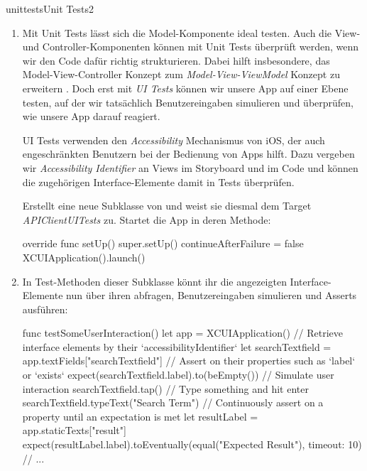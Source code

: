 \documentclass[parskip=half, final]{scrreprt}
\begin{document}
\begin{lecture}
\begin{exc}
\begin{excitem}{unittests}{Unit Tests}{2}
\begin{enumerate}[label=\arabic*.]
Testet natürlich auch die asynchrone API Abfrage. Dazu können wir im Test eine \emph{Expectation} erstellen und mit einem Timeout darauf warten, dass diese asynchron erfüllt wird:
\begin{swiftcode}
    func testSomethingAsynchronous() {
        let expectation = expectationWithDescription("Something asynchronous")
        // Do something asynchronously and call `expectation.fulfill()` when it's done.
        waitForExpectationsWithTimeout(10, handler: nil)
    }
\end{swiftcode}

\item Mit Unit Tests lässt sich die Model-Komponente ideal testen. Auch die View- und Controller-Komponenten können mit Unit Tests überprüft werden, wenn wir den Code dafür richtig strukturieren. Dabei hilft insbesondere, das Model-View-Controller Konzept zum \emph{Model-View-ViewModel} Konzept zu erweitern . Doch erst mit \emph{UI Tests} können wir unsere App auf einer Ebene testen, auf der wir tatsächlich Benutzereingaben simulieren und überprüfen, wie unsere App darauf reagiert.

UI Tests verwenden den \emph{Accessibility} Mechanismus von iOS, der auch engeschränkten Benutzern bei der Bedienung von Apps hilft. Dazu vergeben wir \emph{Accessibility Identifier} an Views im Storyboard und im Code und können die zugehörigen Interface-Elemente damit in Tests überprüfen.

Erstellt eine neue Subklasse von  und weist sie diesmal dem Target \emph{APIClientUITests} zu. Startet die App in deren  Methode:
\begin{swiftcode}
    override func setUp() {
        super.setUp()
        continueAfterFailure = false
        XCUIApplication().launch()
    }
\end{swiftcode}

\item In Test-Methoden dieser Subklasse könnt ihr die angezeigten Interface-Elemente nun über ihren  abfragen, Benutzereingaben simulieren und Asserts ausführen:
\begin{swiftcode}
    func testSomeUserInteraction() {
        let app = XCUIApplication()
        // Retrieve interface elements by their `accessibilityIdentifier`
        let searchTextfield = app.textFields["searchTextfield"]
        // Assert on their properties such as `label` or `exists`
        expect(searchTextfield.label).to(beEmpty())
        // Simulate user interaction
        searchTextfield.tap()
        // Type something and hit enter
        searchTextfield.typeText("Search Term\n")
        // Continuously assert on a property until an expectation is met
        let resultLabel = app.staticTexts["result"]
        expect(resultLabel.label).toEventually(equal("Expected Result"), timeout: 10)
        // ...
    }
\end{swiftcode}


\end{enumerate}
\end{excitem}
\end{exc}
\end{lecture}
\end{document}
